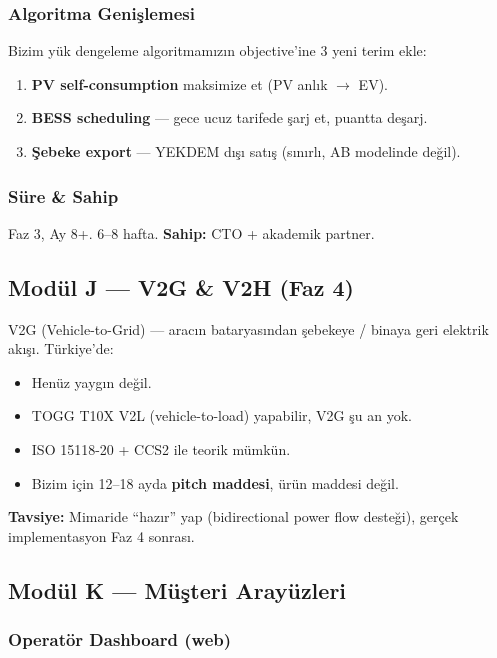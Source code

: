 \documentclass[11pt,a4paper]{article}
\begin{document}
\subsubsection{Algoritma Genişlemesi}

Bizim yük dengeleme algoritmamızın objective'ine 3 yeni terim ekle:
\begin{enumerate}
    \item \textbf{PV self-consumption} maksimize et (PV anlık $\rightarrow$ EV).
    \item \textbf{BESS scheduling} --- gece ucuz tarifede şarj et, puantta deşarj.
    \item \textbf{Şebeke export} --- YEKDEM dışı satış (sınırlı, AB modelinde değil).
\end{enumerate}

\subsubsection{Süre \& Sahip}
Faz 3, Ay 8+. 6--8 hafta. \textbf{Sahip:} CTO + akademik partner.

\subsection{Modül J — V2G \& V2H (Faz 4)}

V2G (Vehicle-to-Grid) — aracın bataryasından şebekeye / binaya geri elektrik akışı. Türkiye'de:
\begin{itemize}
    \item Henüz yaygın değil.
    \item TOGG T10X V2L (vehicle-to-load) yapabilir, V2G şu an yok.
    \item ISO 15118-20 + CCS2 ile teorik mümkün.
    \item Bizim için 12--18 ayda \textbf{pitch maddesi}, ürün maddesi değil.
\end{itemize}
\textbf{Tavsiye:} Mimaride ``hazır'' yap (bidirectional power flow desteği), gerçek implementasyon Faz 4 sonrası.

\subsection{Modül K — Müşteri Arayüzleri}

\subsubsection{Operatör Dashboard (web)}
\end{document}
